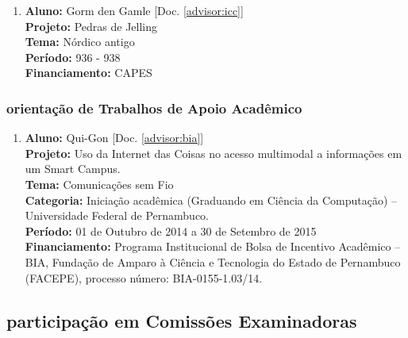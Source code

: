 \documentclass[a4paper,oneside,12pt]{article}
\begin{document}
\begin{enumerate}
\renewcommand{\labelenumi}{{\large\bfseries\arabic{enumi}.}}

\item   \textbf{Aluno:} Gorm den Gamle [Doc. \ref{advisor:icc}] \\
        \textbf{Projeto:} Pedras de Jelling \\
        \textbf{Tema:} Nórdico antigo \\
        \textbf{Período:} 936 - 938\\
        \textbf{Financiamento:} CAPES

\end{enumerate}


\subsubsection{orientação de Trabalhos de Apoio Acadêmico}
\vspace{0.3cm}

\begin{enumerate}
\renewcommand{\labelenumi}{{\large\bfseries\arabic{enumi}.}}

\item   \textbf{Aluno:} Qui-Gon [Doc. \ref{advisor:bia}]\\
        \textbf{Projeto:} Uso da Internet das Coisas no acesso multimodal a informações em um Smart Campus.\\
        \textbf{Tema:} Comunicações sem Fio \\
        \textbf{Categoria:} Iniciação acadêmica (Graduando em Ciência da Computação) – Universidade Federal de Pernambuco.\\
        \textbf{Período:} 01 de Outubro de 2014 a 30 de Setembro de 2015 \\
        \textbf{Financiamento:} Programa Institucional de Bolsa de Incentivo Acadêmico – BIA, Fundação de Amparo à Ciência e Tecnologia do Estado de Pernambuco (FACEPE), processo número: BIA-0155-1.03/14.

\end{enumerate}

\subsection{participação em Comissões Examinadoras}
\vspace{0.3cm}
\end{document}
